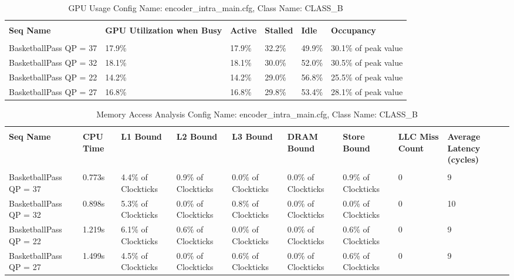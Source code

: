 \documentclass{article}%
\begin{document}
\newpage%
\begin{longtabu}{| X[l] | X[l] | X[l] | X[l] | X[l] | X[l] |}%
\caption{%
GPU Usage\newline%
 Config Name: encoder\_intra\_main.cfg,\newline%
 Class Name: CLASS\_B\newline%
%
}%
\hline%
&&&&&\\%
\textbf{Seq Name}&\textbf{GPU Utilization when Busy}&\textbf{Active}&\textbf{Stalled}&\textbf{Idle}&\textbf{Occupancy}\\%
&&&&&\\%
\hline%
\endhead%
BasketballPass\newline%
 QP = 37&17.9\%&17.9\%&32.2\%&49.9\%&30.1\% of peak value\\%
\hline%
BasketballPass\newline%
 QP = 32&18.1\%&18.1\%&30.0\%&52.0\%&30.5\% of peak value\\%
\hline%
BasketballPass\newline%
 QP = 22&14.2\%&14.2\%&29.0\%&56.8\%&25.5\% of peak value\\%
\hline%
BasketballPass\newline%
 QP = 27&16.8\%&16.8\%&29.8\%&53.4\%&28.1\% of peak value\\%
\hline%
\end{longtabu}%
\begin{longtabu}{| X[l] | X[l] | X[l] | X[l] | X[l] | X[l] | X[l] | X[l] | X[l] |}%
\caption{%
Memory Access Analysis\newline%
 Config Name: encoder\_intra\_main.cfg,\newline%
 Class Name: CLASS\_B\newline%
%
}%
\hline%
&&&&&&&&\\%
\textbf{Seq Name}&\textbf{CPU Time}&\textbf{L1 Bound}&\textbf{L2 Bound}&\textbf{L3 Bound}&\textbf{DRAM Bound}&\textbf{Store Bound}&\textbf{LLC Miss Count}&\textbf{Average Latency (cycles)}\\%
&&&&&&&&\\%
\hline%
\endhead%
BasketballPass\newline%
 QP = 37&0.773s&4.4\% of Clockticks&0.9\% of Clockticks&0.0\% of Clockticks&0.0\% of Clockticks&0.9\% of Clockticks&0&9\\%
\hline%
BasketballPass\newline%
 QP = 32&0.898s&5.3\% of Clockticks&0.0\% of Clockticks&0.8\% of Clockticks&0.0\% of Clockticks&0.0\% of Clockticks&0&10\\%
\hline%
BasketballPass\newline%
 QP = 22&1.219s&6.1\% of Clockticks&0.6\% of Clockticks&0.0\% of Clockticks&0.0\% of Clockticks&0.6\% of Clockticks&0&9\\%
\hline%
BasketballPass\newline%
 QP = 27&1.499s&4.5\% of Clockticks&0.0\% of Clockticks&0.6\% of Clockticks&0.0\% of Clockticks&0.6\% of Clockticks&0&9\\%
\hline%
\end{longtabu}%
\end{document}

